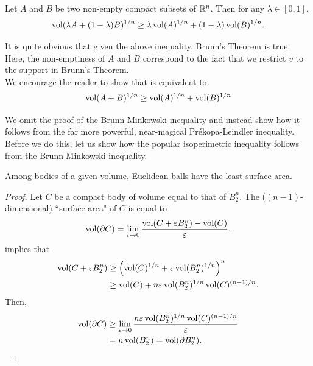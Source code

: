 \begin{ftheo}
\label{brunn minkowski inequality}
Let $A$ and $B$ be two non-empty compact subsets of $\mathbb{R}^n$. Then for any $\lambda\in[0,1]$,
\begin{equation}
\label{eqn brunn minkowski inequality}
    \operatorname{vol}(\lambda A + (1-\lambda) B)^{1/n} \geq \lambda\operatorname{vol}(A)^{1/n} + (1-\lambda)\operatorname{vol}(B)^{1/n}.
\end{equation}
\end{ftheo}
It is quite obvious that given the above inequality, Brunn's Theorem is true. Here, the non-emptiness of $A$ and $B$ correspond to the fact that we restrict $v$ to the support in Brunn's Theorem.\\

We encourage the reader to show that  is equivalent to
\begin{equation}
\label{eqn brunn minkowski inequality alt no lambda}
    \operatorname{vol}(A+B)^{1/n} \geq \operatorname{vol}(A)^{1/n} + \operatorname{vol}(B)^{1/n}
\end{equation}

We omit the proof of the Brunn-Minkowski inequality and instead show how it follows from the far more powerful, near-magical Pr\'{e}kopa-Leindler inequality.\\
Before we do this, let us show how the popular isoperimetric inequality follows from the Brunn-Minkowski inequality.

\begin{theorem}
\label{isoperimetric inequality}
Among bodies of a given volume, Euclidean balls have the least surface area.
\end{theorem}
\begin{proof}
Let $C$ be a compact body of volume equal to that of $B_2^n$. The ($(n-1)$-dimensional) ``surface area" of $C$ is equal to
\[ \operatorname{vol}(\partial C) = \lim_{\varepsilon\to 0} \frac{\operatorname{vol}(C + \varepsilon B_2^n) - \operatorname{vol}(C)}{\varepsilon}. \]
 implies that
\begin{align*}
    \operatorname{vol}(C+\varepsilon B_2^n) &\geq \left(\operatorname{vol}(C)^{1/n} + \varepsilon\operatorname{vol}(B_2^n)^{1/n}\right)^{n} \\
    &\geq \operatorname{vol}(C) + n\varepsilon\operatorname{vol}(B_2^n)^{1/n}\operatorname{vol}(C)^{(n-1)/n}.
\end{align*}
Then,
\begin{align*}
    \operatorname{vol}(\partial C) &\geq \lim_{\varepsilon\to 0} \frac{n\varepsilon\operatorname{vol}(B_2^n)^{1/n}\operatorname{vol}(C)^{(n-1)/n}}{\varepsilon}\\
    &= n\operatorname{vol}(B_2^n) = \operatorname{vol}(\partial B_2^n).\qedhere
\end{align*}
\end{proof}

